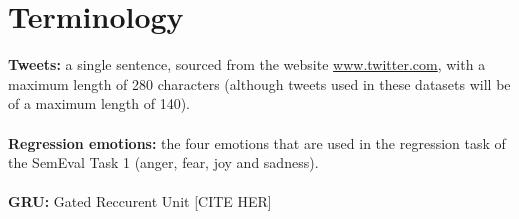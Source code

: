 
\section*{Terminology}

\textbf{Tweets:} a single sentence, sourced from the website \href{www.twitter.com}{www.twitter.com}, with a maximum length of 280 characters (although tweets used in these datasets will be of a maximum length of 140).\\
\\
\textbf{Regression emotions:} the four emotions that are used in the regression task of the SemEval Task 1 (anger, fear, joy and sadness).\\
\\
\textbf{GRU:} Gated Reccurent Unit [CITE HER]